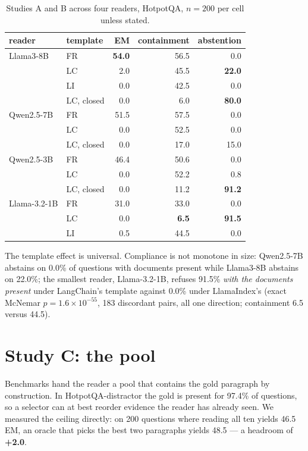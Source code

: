 ﻿\documentclass[11pt]{article}
\begin{document}
\begin{table}[t]
\centering
\caption{Studies A and B across four readers, HotpotQA, $n=200$ per cell unless stated.}
\label{tab:readers}
\begin{tabular}{@{}llrrr@{}}
\toprule
reader & template & EM & containment & abstention \\
\midrule
Llama3-8B & FR & \textbf{54.0} & 56.5 & 0.0 \\
          & LC & 2.0 & 45.5 & \textbf{22.0} \\
          & LI & 0.0 & 42.5 & 0.0 \\
          & LC, closed & 0.0 & 6.0 & \textbf{80.0} \\
\midrule
Qwen2.5-7B & FR & 51.5 & 57.5 & 0.0 \\
           & LC & 0.0 & 52.5 & 0.0 \\
           & LC, closed & 0.0 & 17.0 & 15.0 \\
\midrule
Qwen2.5-3B & FR & 46.4 & 50.6 & 0.0 \\
           & LC & 0.0 & 52.2 & 0.8 \\
           & LC, closed & 0.0 & 11.2 & \textbf{91.2} \\
\midrule
Llama-3.2-1B & FR & 31.0 & 33.0 & 0.0 \\
             & LC & 0.0 & \textbf{6.5} & \textbf{91.5} \\
             & LI & 0.5 & 44.5 & 0.0 \\
\bottomrule
\end{tabular}
\end{table}

The template effect is universal. Compliance is not monotone in size: Qwen2.5-7B abstains on
0.0\% of questions with documents present while Llama3-8B abstains on 22.0\%; the smallest
reader, Llama-3.2-1B, refuses 91.5\% \emph{with the documents present} under LangChain's
template against 0.0\% under LlamaIndex's (exact McNemar $p=1.6\times10^{-55}$, 183 discordant
pairs, all one direction; containment 6.5 versus 44.5).

\section{Study C: the pool}
\label{sec:pool}

Benchmarks hand the reader a pool that contains the gold paragraph by construction. In
HotpotQA-distractor the gold is present for 97.4\% of questions, so a selector can at best
reorder evidence the reader has already seen. We measured the ceiling directly: on 200 questions
where reading all ten yields 46.5 EM, an oracle that picks the best two paragraphs yields 48.5
--- a headroom of \textbf{+2.0}.
\end{document}
